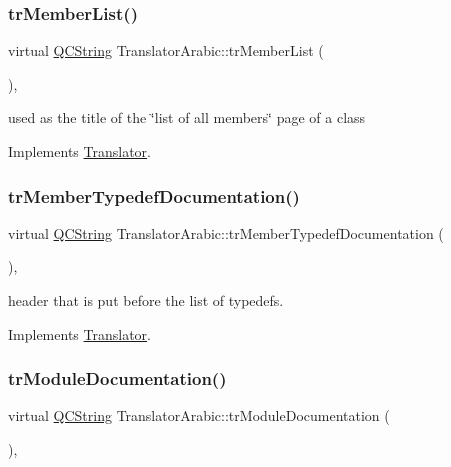 \subsubsection{\texorpdfstring{trMemberList()}{trMemberList()}}
{\footnotesize\ttfamily virtual \mbox{\hyperlink{class_q_c_string}{Q\+C\+String}} Translator\+Arabic\+::tr\+Member\+List (\begin{DoxyParamCaption}{ }\end{DoxyParamCaption})\hspace{0.3cm}{\ttfamily [inline]}, {\ttfamily [virtual]}}

used as the title of the \char`\"{}list of all members\char`\"{} page of a class 

Implements \mbox{\hyperlink{class_translator}{Translator}}.

\mbox{\label{class_translator_arabic_ab82b5f6a07c83e26bee7c5d04b6d790b}} 
\subsubsection{\texorpdfstring{trMemberTypedefDocumentation()}{trMemberTypedefDocumentation()}}
{\footnotesize\ttfamily virtual \mbox{\hyperlink{class_q_c_string}{Q\+C\+String}} Translator\+Arabic\+::tr\+Member\+Typedef\+Documentation (\begin{DoxyParamCaption}{ }\end{DoxyParamCaption})\hspace{0.3cm}{\ttfamily [inline]}, {\ttfamily [virtual]}}

header that is put before the list of typedefs. 

Implements \mbox{\hyperlink{class_translator}{Translator}}.

\mbox{\label{class_translator_arabic_a2d1938484e265a2ca1c0d73fd9f750cf}} 
\subsubsection{\texorpdfstring{trModuleDocumentation()}{trModuleDocumentation()}}
{\footnotesize\ttfamily virtual \mbox{\hyperlink{class_q_c_string}{Q\+C\+String}} Translator\+Arabic\+::tr\+Module\+Documentation (\begin{DoxyParamCaption}{ }\end{DoxyParamCaption})\hspace{0.3cm}{\ttfamily [inline]}, {\ttfamily [virtual]}}

